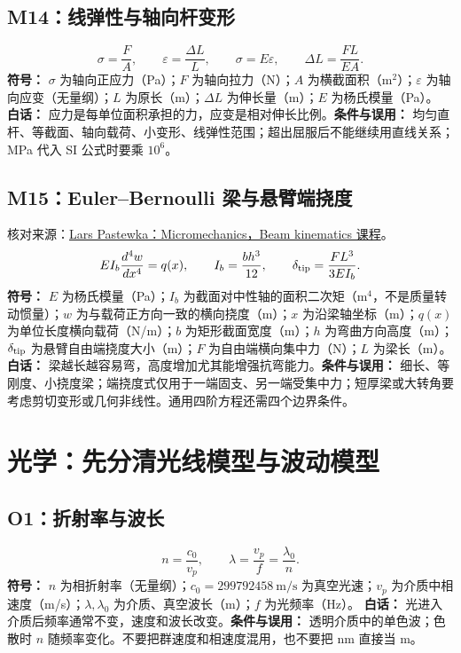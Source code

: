\subsection{M14：线弹性与轴向杆变形}
\begin{equation}
\sigma=\frac{F}{A},\qquad \varepsilon=\frac{\Delta L}{L},\qquad \sigma=E\varepsilon,\qquad \Delta L=\frac{FL}{EA}.
\end{equation}
\textbf{符号：} $\sigma$ 为轴向正应力（Pa）；$F$ 为轴向拉力（N）；$A$ 为横截面积（m$^2$）；$\varepsilon$ 为轴向应变（无量纲）；$L$ 为原长（m）；$\Delta L$ 为伸长量（m）；$E$ 为杨氏模量（Pa）。
\textbf{白话：} 应力是每单位面积承担的力，应变是相对伸长比例。\textbf{条件与误用：} 均匀直杆、等截面、轴向载荷、小变形、线弹性范围；超出屈服后不能继续用直线关系；MPa 代入 SI 公式时要乘 $10^6$。

\subsection{M15：Euler--Bernoulli 梁与悬臂端挠度}
核对来源：\href{https://pastewka.github.io/Micromechanics/lecture/chapter04.html}{Lars Pastewka：Micromechanics，Beam kinematics 课程}。
\begin{equation}
EI_b\frac{d^4w}{dx^4}=q(x),\qquad I_b=\frac{bh^3}{12},\qquad \delta_{\rm tip}=\frac{FL^3}{3EI_b}.
\end{equation}
\textbf{符号：} $E$ 为杨氏模量（Pa）；$I_b$ 为截面对中性轴的面积二次矩（m$^4$，不是质量转动惯量）；$w$ 为与载荷正方向一致的横向挠度（m）；$x$ 为沿梁轴坐标（m）；$q(x)$ 为单位长度横向载荷（N/m）；$b$ 为矩形截面宽度（m）；$h$ 为弯曲方向高度（m）；$\delta_{\rm tip}$ 为悬臂自由端挠度大小（m）；$F$ 为自由端横向集中力（N）；$L$ 为梁长（m）。
\textbf{白话：} 梁越长越容易弯，高度增加尤其能增强抗弯能力。\textbf{条件与误用：} 细长、等刚度、小挠度梁；端挠度式仅用于一端固支、另一端受集中力；短厚梁或大转角要考虑剪切变形或几何非线性。通用四阶方程还需四个边界条件。

\section{光学：先分清光线模型与波动模型}
\subsection{O1：折射率与波长}
\begin{equation}
n=\frac{c_0}{v_p},\qquad \lambda=\frac{v_p}{f}=\frac{\lambda_0}{n}.
\end{equation}
\textbf{符号：} $n$ 为相折射率（无量纲）；$c_0=299792458\ \mathrm{m/s}$ 为真空光速；$v_p$ 为介质中相速度（m/s）；$\lambda,\lambda_0$ 为介质、真空波长（m）；$f$ 为光频率（Hz）。
\textbf{白话：} 光进入介质后频率通常不变，速度和波长改变。\textbf{条件与误用：} 透明介质中的单色波；色散时 $n$ 随频率变化。不要把群速度和相速度混用，也不要把 nm 直接当 m。

